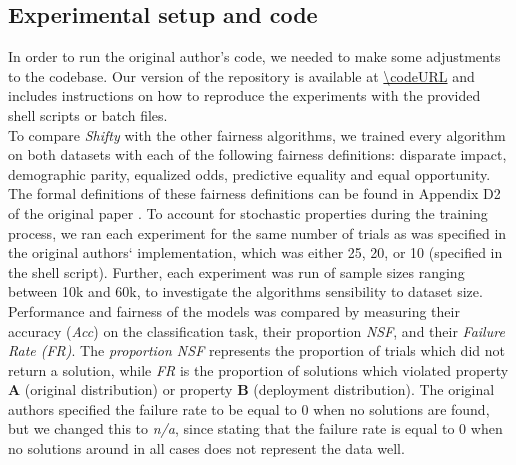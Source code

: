 \subsection{Experimental setup and code}

In order to run the original author's code, we needed to make some adjustments to the codebase. Our version of the repository is available at \url{\codeURL} and includes instructions on how to reproduce the experiments with the provided shell scripts or batch files. \\

To compare \textit{Shifty} with the other fairness algorithms, we trained every algorithm on both datasets with each of the following fairness definitions: disparate impact, demographic parity, equalized odds, predictive equality and equal opportunity. The formal definitions of these fairness definitions can be found in Appendix D2 of the original paper \cite{giguere2022}. To account for stochastic properties during the training process, we ran each experiment for the same number of trials as was specified in the original authors` implementation, which was either 25, 20, or 10 (specified in the shell script). Further, each experiment was run of sample sizes ranging between 10k and 60k, to investigate the algorithms sensibility to dataset size.
Performance and fairness of the models was compared by measuring their accuracy (\textit{Acc}) on the classification task, their proportion \textit{NSF}, and their \textit{Failure Rate (FR)}. The \textit{proportion NSF} represents the proportion of trials which did not return a solution, while \textit{FR} is the proportion of solutions which violated property \textbf{A} (original distribution) or property \textbf{B} (deployment distribution). The original authors specified the failure rate to be equal to $0$ when no solutions are found, but we changed this to \textit{n/a}, since stating that the failure rate is equal to $0$ when no solutions around in all cases does not represent the data well. \\


